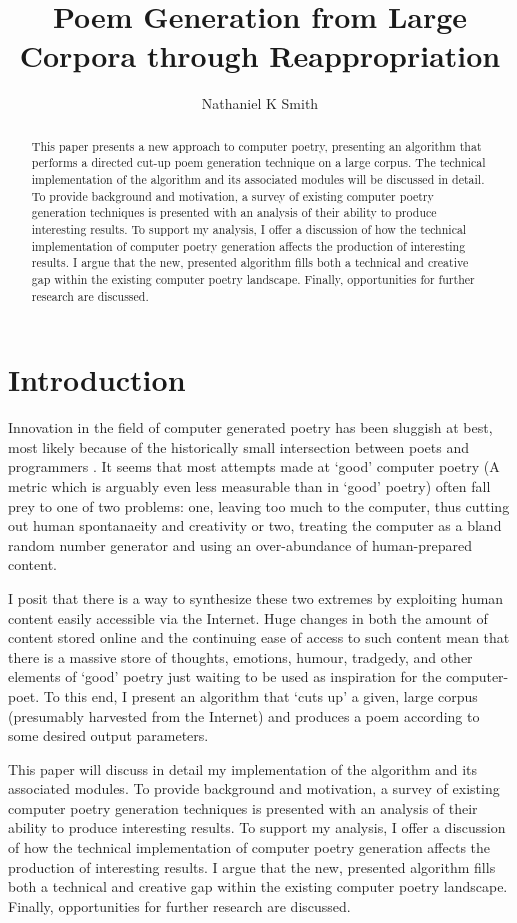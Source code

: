 \documentclass[10pt]{article}
\title{Poem Generation from Large Corpora through Reappropriation}
\author{Nathaniel K Smith}
\begin{document}
\maketitle

\begin{abstract}
This paper presents a new approach to computer poetry, presenting an algorithm
that performs a directed cut-up poem generation technique on a large corpus. The
technical implementation of the algorithm and its associated modules will be
discussed in detail. To provide background and motivation, a survey of existing
computer poetry generation techniques is presented with an analysis of their
ability to produce interesting results. To support my analysis, I offer a
discussion of how the technical implementation of computer poetry generation
affects the production of interesting results. I argue that the new, presented
algorithm fills both a technical and creative gap within the existing computer
poetry landscape. Finally, opportunities for further research are discussed.
\end{abstract}

\section{Introduction}
Innovation in the field of computer generated poetry has been sluggish at best,
most likely because of the historically small intersection between poets and
programmers \cite{Hart96}. It seems that most attempts made at `good' computer
poetry (A metric which is arguably even less measurable than in `good' poetry)
often fall prey to one of two problems: one, leaving too much to the computer,
thus cutting out human spontanaeity and creativity or two, treating the
computer as a bland random number generator and using an over-abundance of
human-prepared content.

I posit that there is a way to synthesize these two extremes by exploiting
human content easily accessible via the Internet. Huge changes in both the
amount of content stored online and the continuing ease of access to such
content mean that there is a massive store of thoughts, emotions, humour,
tradgedy, and other elements of `good' poetry just waiting to be used as
inspiration for the computer-poet. To this end, I present an algorithm that
`cuts up' a given, large corpus (presumably harvested from the Internet) and
produces a poem according to some desired output parameters.

This paper will discuss in detail my implementation of the algorithm and its
associated modules. To provide background and motivation, a survey of existing
computer poetry generation techniques is presented with an analysis of their
ability to produce interesting results. To support my analysis, I offer a
discussion of how the technical implementation of computer poetry generation
affects the production of interesting results. I argue that the new, presented
algorithm fills both a technical and creative gap within the existing computer
poetry landscape. Finally, opportunities for further research are discussed.
\end{document}
